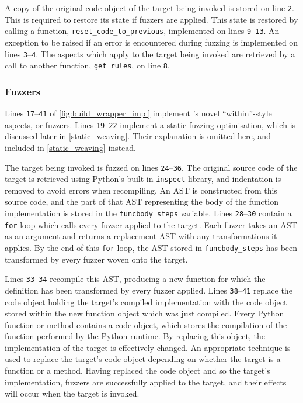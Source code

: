 A copy of the original code object of the target being invoked is stored on line
\texttt{2}. This is required to restore its state if fuzzers are applied. This
state is restored by calling a function, \lstinline{reset_code_to_previous},
implemented on lines \texttt{9}--\texttt{13}. An exception to be raised if an
error is encountered during fuzzing is implemented on lines
\texttt{3}--\texttt{4}. The aspects which apply to the target being invoked are
retrieved by a call to another function, \lstinline{get_rules}, on line
\texttt{8}. 

\subsubsection{Fuzzers}

Lines \texttt{17}--\texttt{41} of \cref{fig:build_wrapper_impl} implement
\pdsf{}'s novel ``within''-style aspects, or fuzzers. 
Lines \texttt{19}--\texttt{22} implement a static fuzzing optimisation, which is
discussed later in \cref{static_weaving}. Their explanation is omitted here, and
included in \cref{static_weaving} instead.

The target being invoked is fuzzed on lines \texttt{24}--\texttt{36}. The
original source code of the target is retrieved using Python's built-in
\lstinline{inspect} library, and indentation is removed to avoid errors when
recompiling. An AST is constructed from this source code, and the part of that
AST representing the body of the function implementation is stored in the
\lstinline{funcbody_steps} variable. Lines \texttt{28}--\texttt{30} contain a
\lstinline{for} loop which calls every fuzzer applied to the target. Each fuzzer
takes an AST as an argument and returns a replacement AST with any
transformations it applies. By the end of this \lstinline{for} loop, the AST
stored in \lstinline{funcbody_steps} has been transformed by every fuzzer woven
onto the target.

Lines \texttt{33}--\texttt{34} recompile this AST, producing a new function for
which the definition has been transformed by every fuzzer applied. Lines
\texttt{38}--\texttt{41} replace the code object holding the target's compiled
implementation with the code object stored within the new function object which
was just compiled. Every Python function or method contains a code object, which
stores the compilation of the function performed by the Python runtime. By
replacing this object, the implementation of the target is effectively changed.
An appropriate technique is used to replace the target's code object depending
on whether the target is a function or a method. Having replaced the code object
and so the target's implementation, fuzzers are successfully applied to the
target, and their effects will occur when the target is invoked.


